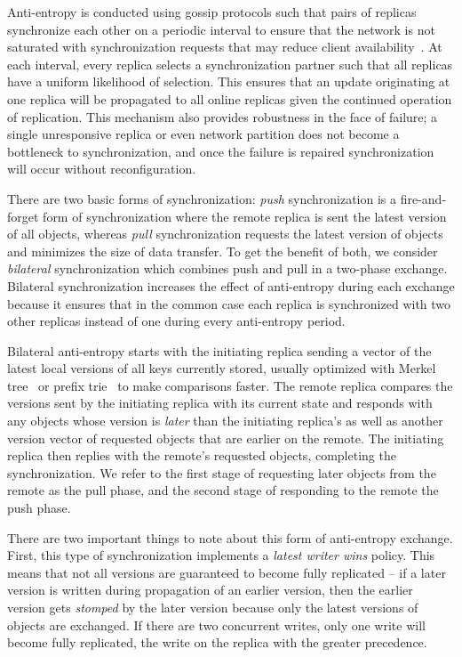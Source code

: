 Anti-entropy is conducted using gossip protocols such that pairs of replicas synchronize each other on a periodic interval to ensure that the network is not saturated with synchronization requests that may reduce client availability~\cite{gossip_protocols,kempe_gossip,reliable_gossip}.
At each interval, every replica selects a synchronization partner such that
all replicas have a uniform likelihood of selection.
This ensures that an update originating at one replica will be propagated to
all online replicas given the continued operation of replication.
This mechanism also provides robustness in the face of failure; a single
unresponsive replica or even network partition does not become a bottleneck
to synchronization, and once the failure is repaired synchronization will
occur without reconfiguration.

There are two basic forms of synchronization: \textit{push} synchronization
is a fire-and-forget form of synchronization where the remote replica is sent
the latest version of all objects, whereas \textit{pull} synchronization
requests the latest version of objects and minimizes the size of data
transfer.
To get the benefit of both, we consider \textit{bilateral} synchronization
which combines push and pull in a two-phase exchange.
Bilateral synchronization increases the effect of anti-entropy during each
exchange because it ensures that in the common case each replica is
synchronized with two other replicas instead of one during every anti-entropy
period.

Bilateral anti-entropy starts with the initiating replica sending a vector of
the latest local versions of all keys currently stored, usually optimized
with Merkel tree~\cite{merkle_tree} or prefix trie~\cite{prefix_trie} to make comparisons faster.
The remote replica compares the versions sent by the initiating replica with
its current state and responds with any objects whose version is
\textit{later} than the initiating replica's as well as another version
vector of requested objects that are earlier on the remote.
The initiating replica then replies with the remote's requested objects,
completing the synchronization.
We refer to the first stage of requesting later objects from the remote as
the pull phase, and the second stage of responding to the remote the push
phase.

There are two important things to note about this form of anti-entropy
exchange.
First, this type of synchronization implements a \textit{latest writer wins}
policy.
This means that not all versions are guaranteed to become fully replicated
-- if a later version is written during propagation of an earlier version,
then the earlier version gets \emph{stomped} by the later version because
only the latest versions of objects are exchanged.
If there are two concurrent writes, only one write will become fully
replicated, the write on the replica with the greater precedence.

